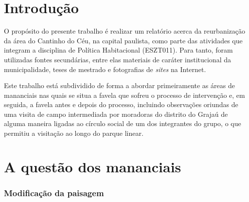 	
	
	\tableofcontents 
	\newpage \listoffigures
	\newpage \listoftables
	\textual
	
	
	
	
	\chapter{Introdução}
	
	O propósito do presente trabalho é realizar um relatório acerca da reurbanização da área do Cantinho do Céu, na capital paulista, como parte das atividades que integram a disciplina de Política Habitacional (ESZT011). Para tanto, foram utilizadas fontes secundárias, entre elas materiais de caráter institucional da municipalidade, teses de mestrado e fotografias de \textit{sites} na Internet.
	
	Este trabalho está subdividido de forma a abordar primeiramente as áreas de mananciais nas quais se situa a favela que sofreu o processo de intervenção e, em seguida, a favela antes e depois do processo, incluindo observações oriundas de uma visita de campo intermediada por moradoras do distrito do Grajaú de alguma maneira ligadas ao círculo social de um dos integrantes do grupo, o que permitiu a visitação ao longo do parque linear.
	
	\chapter{A questão dos mananciais}
	
	\subsection{Modificação da paisagem} \label{light}
	
